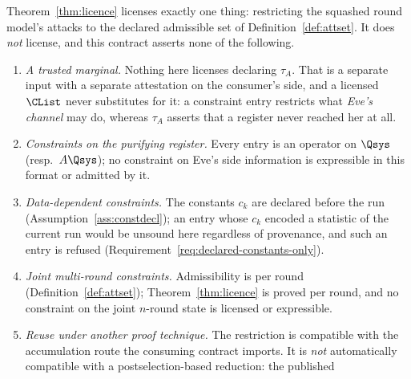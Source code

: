 
\begin{remark}
\label{rem:notlicensed}
Theorem~\ref{thm:licence} licenses exactly one thing: restricting the squashed
round model's attacks to the declared admissible set of
Definition~\ref{def:attset}. It does \emph{not} license, and this contract
asserts none of the following.
\begin{enumerate}[label=(\alph*),leftmargin=2.4em]
\item \emph{A trusted marginal.} Nothing here licenses declaring $\tau_A$. That
  is a separate input with a separate attestation on the consumer's side, and a
  licensed $\CList$ never substitutes for it: a constraint entry restricts what
  \emph{Eve's channel} may do, whereas $\tau_A$ asserts that a register never
  reached her at all.
\item \emph{Constraints on the purifying register.} Every entry is an operator
  on $\Qsys$ (resp.\ $A\Qsys$); no constraint on Eve's side information is
  expressible in this format or admitted by it.
\item \emph{Data-dependent constraints.} The constants $c_k$ are declared
  before the run (Assumption~\ref{ass:constdecl}); an entry whose $c_k$ encoded
  a statistic of the current run would be unsound here regardless of
  provenance, and such an entry is refused
  (Requirement~\ref{req:declared-constants-only}).
\item \emph{Joint multi-round constraints.} Admissibility is per round
  (Definition~\ref{def:attset}); Theorem~\ref{thm:licence} is proved per round,
  and no constraint on the joint $n$-round state is licensed or expressible.
\item \emph{Reuse under another proof technique.} The restriction is compatible
  with the accumulation route the consuming contract imports. It is \emph{not}
  automatically compatible with a postselection-based reduction: the published

\end{enumerate}
\end{remark}

